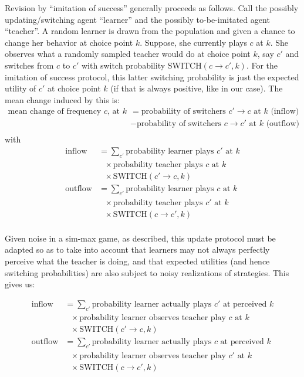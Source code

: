 \documentclass[fleqn,reqno,11pt]{article}
\begin{document}
Revision by ``imitation of success'' generally proceeds as follows. Call the possibly
updating/switching agent ``learner'' and the possibly to-be-imitated agent ``teacher''. A
random learner is drawn from the population and given a chance to change her behavior at choice
point $k$. Suppose, she currently plays $c$ at $k$. She observes what a randomly sampled
teacher would do at choice point $k$, say $c'$ and switches from $c$ to $c'$ with switch
probability $\text{SWITCH}(c \rightarrow c' , k)$. For the imitation of success protocol, this
latter switching probability is just the expected utility of $c'$ at choice point $k$ (if that
is always positive, like in our case). The mean change induced by this is:
\begin{align*}
  \text{mean change of frequency $c$, at $k$} & = \text{probability of switchers $c'
    \rightarrow c$ at $k$ (inflow)} \\
& - \text{probability of switchers $c \rightarrow c'$ at $k$ (outflow)} \\
\end{align*}
with
\begin{align*}
  \text{inflow} & = \sum_{c'} \text{probability learner plays $c'$ at $k$} \\
  & \ \ \ \times \text{probability teacher plays $c$ at $k$} \\
  & \ \ \ \times \text{SWITCH}(c' \rightarrow c , k) \\
  \text{outflow} & = \sum_{c'} \text{probability learner plays $c$ at $k$} \\
  & \ \ \ \times \text{probability teacher plays $c'$ at $k$} \\
  & \ \ \ \times \text{SWITCH}(c \rightarrow c' , k) \\
\end{align*}

Given noise in a sim-max game, as described, this update protocol must be adapted so as to take
into account that learners may not always perfectly perceive what the teacher is doing, and
that expected utilities (and hence switching probabilities) are also subject to noisy
realizations of strategies. This gives us:

\begin{align*}
  \text{inflow} & = \sum_{c'} \text{probability learner actually plays $c'$ at perceived $k$} \\
  & \ \ \ \times \text{probability learner observes teacher play $c$ at $k$} \\
  & \ \ \ \times \text{SWITCH}(c' \rightarrow c , k) \\
  \text{outflow} & = \sum_{c'} \text{probability learner actually plays $c$ at perceived $k$} \\
  & \ \ \ \times \text{probability learner observes teacher play $c'$ at $k$} \\
  & \ \ \ \times \text{SWITCH}(c \rightarrow c' , k) \\
\end{align*}
\end{document}
